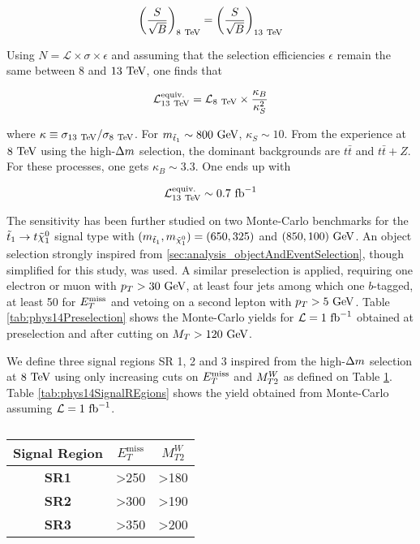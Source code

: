         $$ \left( \frac{S}{\sqrt{B}} \right)_{8~\text{TeV}} = \left( \frac{S}{\sqrt{B}} \right)_{13~\text{TeV}}  $$

        Using $N = \mathcal{L} \times \sigma \times \epsilon$ and assuming that the selection
        efficiencies $\epsilon$ remain the same between $8$ and $13~\text{TeV}$, one finds that

        $$ \mathcal{L}^\text{equiv.}_{13~\text{TeV}} = \mathcal{L}_{8~\text{TeV}} \times \frac{\kappa_B}{\kappa^2_S} $$

        where $\kappa \equiv \sigma_{13~\text{TeV}} / \sigma_{8~\text{TeV}}$. For $m_{\tilde{t}_1} \sim 800~\text{GeV}$,
        $\kappa_S \sim 10$. From the experience at $8~\text{TeV}$ using the high-$\Delta m$ selection,
        the dominant backgrounds are $t\bar{t}$ and $t\bar{t}+Z$. For these processes, one
        gets $\kappa_B \sim 3.3$. One ends up with

        $$ \mathcal{L}^\text{equiv.}_{13~\text{TeV}} \sim 0.7~\text{fb}^{-1}$$

        The sensitivity has been further studied on two Monte-Carlo benchmarks for the
        $\tilde{t}_1 \rightarrow t \tilde{\chi}_1^0$ signal type with $(m_{\tilde{t}_1},
        m_{\tilde{\chi}_1^0}) = (650,325)$ and $(850,100) ~\text{GeV}$. An object selection
        strongly inspired from \ref{sec:analysis_objectAndEventSelection}, though simplified
        for this study, was used. A similar preselection is applied, requiring one electron
        or muon with $p_T > 30~\text{GeV}$, at least four jets among which one $b$-tagged, at least
        50 \GeV for $E_T^\text{miss}$ and vetoing on a second lepton with $p_T > 5~\text{GeV}$. Table \ref{tab:phys14Preselection}
        shows the Monte-Carlo yields for $\mathcal{L} = 1~\text{fb}^{-1}$ obtained at preselection
        and after cutting on $M_T > 120~\text{GeV}$.

        \begin{table}
            \centering
            
            \caption{ \label{tab:phys14Preselection}}
        \end{table}

        We define three signal regions SR 1, 2 and 3 inspired from the high-$\Delta m$
        selection at $8~\text{TeV}$ using only increasing cuts on $E_T^\text{miss}$ and $M_{T2}^W$ as defined
        on Table \ref{tab:phys14Cuts}. Table \ref{tab:phys14SignalREgions} shows the yield
        obtained from Monte-Carlo assuming $\mathcal{L} = 1~\text{fb}^{-1}$.

        \begin{table}
            \centering
            \begin{tabular}{c|cc}
                \textbf{Signal Region} & $E_T^\text{miss}$ & $M_{T2}^W$ \\
                \hline
                \textbf{SR1}           & >250 & >180 \\
                \textbf{SR2}           & >300 & >190 \\
                \textbf{SR3}           & >350 & >200 \\
            \end{tabular}
            \caption{ \label{tab:phys14Cuts}}
        \end{table}

